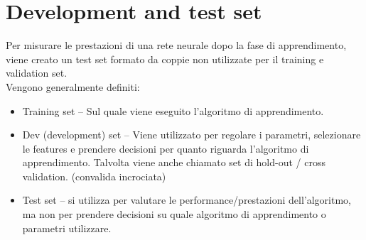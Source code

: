 %


\section{Development and test set }
\label{sec:DevelopmentAndTestSet}
Per misurare le prestazioni di una rete neurale dopo la fase di apprendimento, viene creato un test set formato da coppie non utilizzate per il training e validation set.\\
Vengono generalmente definiti: 
\begin{itemize}
	\item Training set – Sul quale viene eseguito l'algoritmo di apprendimento.
	\item Dev (development) set – Viene utilizzato per regolare i parametri, selezionare le features e prendere decisioni per quanto riguarda l'algoritmo di apprendimento. Talvolta viene anche chiamato set di hold-out / cross  validation. (convalida incrociata)
	\item Test set – si utilizza per valutare le performance/prestazioni dell'algoritmo, ma non per prendere decisioni su quale algoritmo di apprendimento o parametri utilizzare. 
\end{itemize}

